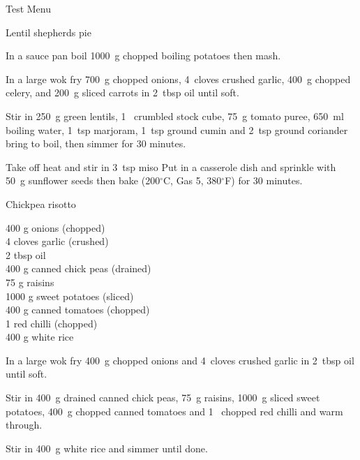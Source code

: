 \begin{menu}{Test Menu}
\begin{recipe}{2}{Lentil shepherds pie}
	
    \begin{instructions}
    \item 
        In a sauce pan boil
        1000~g chopped boiling potatoes
        then mash.
      \item 
        In a large wok fry
        700~g chopped onions,
        4~cloves crushed garlic,
        400~g chopped celery,
        and
        200~g sliced carrots
        in
        2~tbsp  oil
        until soft.
      \item 
        Stir in
        250~g  green lentils,
        1~ crumbled stock cube,
        75~g  tomato puree,
        650~ml  boiling water,
        1~tsp  marjoram,
        1~tsp  ground cumin
        and
        2~tsp  ground coriander
        bring to boil,
        then simmer for 30 minutes.
      \item 
        Take off heat and stir in
        3~tsp  miso
        Put in a casserole dish
        and sprinkle with
        50~g  sunflower seeds
        then bake 
      (200$^{\circ}$C, Gas 5, 380$^{\circ}$F)
     for 30 minutes.
      
    \end{instructions}
    \end{recipe}%
  
    \begin{recipe}{2}{Chickpea risotto}%
    
		\begin{ingredients}
		400 g onions (chopped) \\
	4 cloves garlic (crushed) \\
	2 tbsp oil  \\
	400 g canned chick peas (drained) \\
	75 g raisins  \\
	1000 g sweet potatoes (sliced) \\
	400 g canned tomatoes (chopped) \\
	1  red chilli (chopped) \\
	400 g white rice  \\
	
		\end{ingredients}
	
    \begin{instructions}
    \item 
        In a large wok fry
        400~g chopped onions
        and
        4~cloves crushed garlic
        in
        2~tbsp  oil
        until soft.
      \item 
        Stir in
        400~g drained canned chick peas,
        75~g  raisins,
        1000~g sliced sweet potatoes,
        400~g chopped canned tomatoes
        and
        1~ chopped red chilli
        and warm through.
      \item 
        Stir in
        400~g  white rice
        and simmer until done.
      

\end{instructions}
\end{recipe}
\end{menu}
